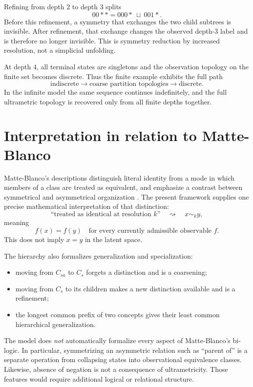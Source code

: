\documentclass[11pt]{article}
\theoremstyle{definition}
\theoremstyle{remark}
\newcommand{\cyl}[1]{C_{#1}}
\begin{document}
Refining from depth $2$ to depth $3$ splits
\[
00**=000*\ \sqcup\ 001*.
\]
Before this refinement, a symmetry that exchanges the two child subtrees is invisible.  After refinement, that exchange changes the observed depth-$3$ label and is therefore no longer invisible.  This is symmetry reduction by increased resolution, not a simplicial unfolding.

At depth $4$, all terminal states are singletons and the observation topology on the finite set becomes discrete.  Thus the finite example exhibits the full path
\[
\text{indiscrete}\to\text{coarse partition topologies}\to\text{discrete}.
\]
In the infinite model the same sequence continues indefinitely, and the full ultrametric topology is recovered only from all finite depths together.

\section{Interpretation in relation to Matte-Blanco}

Matte-Blanco's descriptions distinguish literal identity from a mode in which members of a class are treated as equivalent, and emphasize a contrast between symmetrical and asymmetrical organization \cite{MatteBlanco1975}.  The present framework supplies one precise mathematical interpretation of that distinction:
\[
\text{``treated as identical at resolution }k\text{''}
\quad\rightsquigarrow\quad
x\sim_k y,
\]
meaning
\[
f(x)=f(y)\quad\text{for every currently admissible observable }f.
\]
This does not imply $x=y$ in the latent space.

The hierarchy also formalizes generalization and specialization:
\begin{itemize}
\item moving from $\cyl{sa}$ to $\cyl{s}$ forgets a distinction and is a coarsening;
\item moving from $\cyl{s}$ to its children makes a new distinction available and is a refinement;
\item the longest common prefix of two concepts gives their least common hierarchical generalization.
\end{itemize}

The model does \emph{not} automatically formalize every aspect of Matte-Blanco's bi-logic.  In particular, symmetrizing an asymmetric relation such as ``parent of'' is a separate operation from collapsing states into observational equivalence classes.  Likewise, absence of negation is not a consequence of ultrametricity.  Those features would require additional logical or relational structure.
\end{document}
